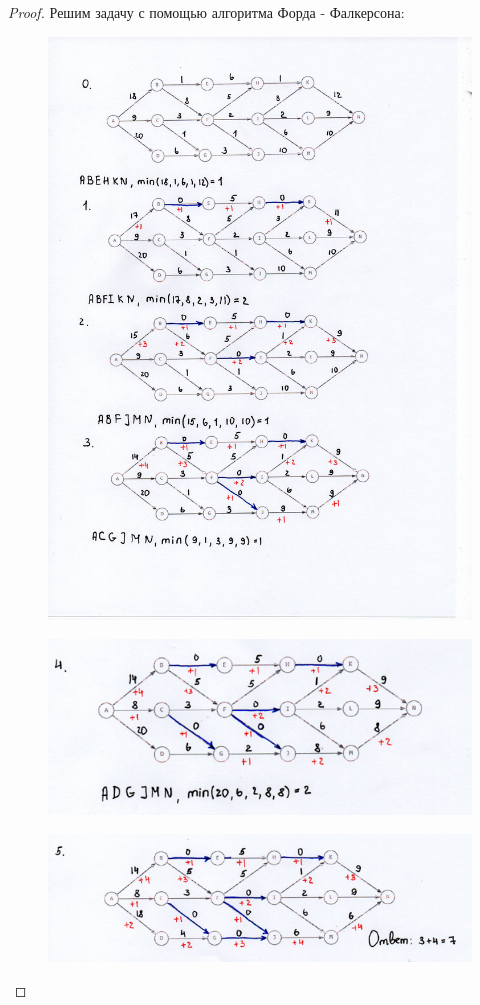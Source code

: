 \begin{proof}

    Решим задачу с помощью алгоритма Форда - Фалкерсона:
    
    \begin{figure}[h]
    \centering
     \includegraphics[width=0.7\linewidth]{pics/13thSolution1.jpg}
     \label{fig:dm}
    \end{figure}

    \begin{figure}[h]
    \centering
     \includegraphics[width=0.65\linewidth]{pics/13thSolution4.png}
     \label{fig:dm}
    \end{figure}

    \begin{figure}[h]
    \centering
     \includegraphics[width=0.65\linewidth]{pics/13thSolution5.png}
     \label{fig:dm}
    \end{figure}

\end{proof}

